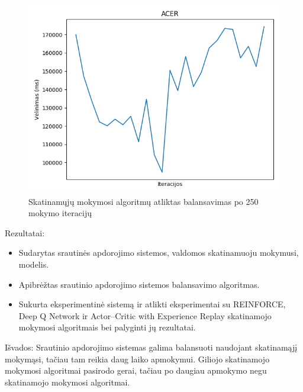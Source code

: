 \documentclass{VUMIFPSbakalaurinis}
\begin{document}
\begin{figure}[H]
\begin{minipage}[b]{0.4\textwidth}
        \includegraphics[width=\textwidth]{img/acer_250.png}
    \end{minipage}
    \caption{Skatinamųjų mokymosi algoritmų atliktas balansavimas po 250 mokymo iteracijų}
\end{figure}
      

Rezultatai:
\begin{itemize}
    \item Sudarytas srautinės apdorojimo sistemos, valdomos skatinamuoju mokymusi, modelis.
    \item Apibrėžtas srautinio apdorojimo sistemos balansavimo algoritmas.
    \item Sukurta eksperimentinė sistemą ir atlikti eksperimentai su REINFORCE, Deep Q Network ir Actor–Critic with Experience Replay skatinamojo mokymosi algoritmais bei palyginti jų rezultatai.
\end{itemize}

Išvados:
Srautinio apdorojimo sistemas galima balansuoti naudojant skatinamąjį mokymąsi, tačiau tam reikia daug laiko apmokymui.
Giliojo skatinamojo mokymosi algoritmai pasirodo gerai, tačiau po daugiau apmokymo negu skatinamojo mokymosi algoritmai.
\printbibliography[heading=bibintoc] 
\end{document}
